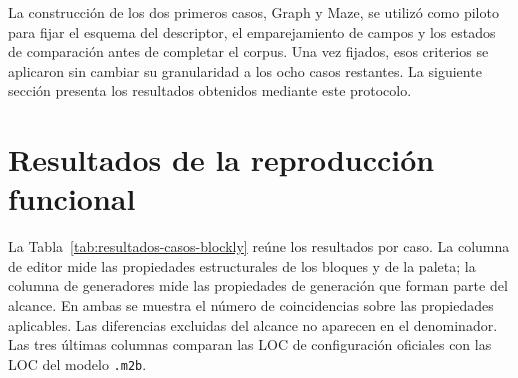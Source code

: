 La construcción de los dos primeros casos, Graph y Maze, se utilizó como piloto
para fijar el esquema del descriptor, el emparejamiento de campos y los estados
de comparación antes de completar el corpus. Una vez fijados, esos criterios se
aplicaron sin cambiar su granularidad a los ocho casos restantes. La siguiente
sección presenta los resultados obtenidos mediante este protocolo.

\section{Resultados de la reproducción funcional}
\label{sec:resultados-reproduccion}

La Tabla~\ref{tab:resultados-casos-blockly} reúne los resultados por caso. La
columna de editor mide las propiedades estructurales de los bloques y de la
paleta; la columna de generadores mide las propiedades de generación que forman
parte del alcance. En ambas se muestra el número de coincidencias sobre las
propiedades aplicables. Las diferencias excluidas del alcance no aparecen en el
denominador. Las tres últimas columnas comparan las LOC de configuración
oficiales con las LOC del modelo \texttt{.m2b}.

\begin{table}[htbp]
  \centering
  \caption{Resultados por caso: paridad funcional y esfuerzo de especificación}
  \label{tab:resultados-casos-blockly}
\end{table}

